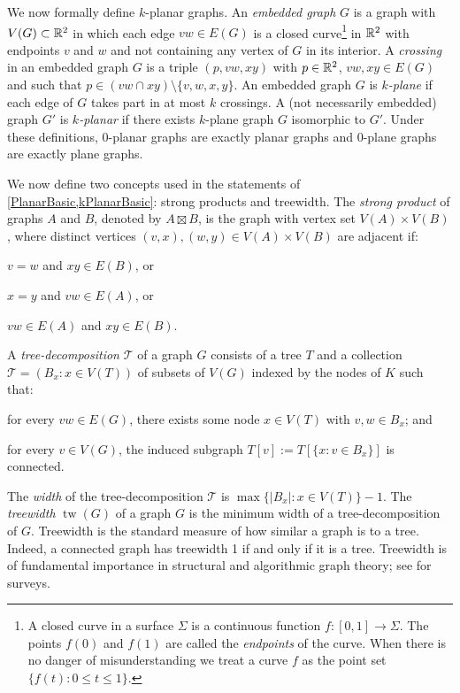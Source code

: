 \documentclass{patmorin}
\DeclareMathOperator{\tw}{tw}
\renewcommand{\le}{\leqslant}
\begin{document}
We now formally define $k$-planar graphs.  An \emph{embedded graph} $G$ is a graph with $V(G)\subset\mathbb{R}^2$ in which each edge $vw\in E(G)$ is a closed curve\footnote{A closed curve in a surface $\Sigma$ is a continuous function $f:[0,1]\to \Sigma$. The points $f(0)$ and $f(1)$ are called the \emph{endpoints} of the curve.  When there is no danger of misunderstanding we treat a curve $f$ as the point set $\{f(t):0\le t\le 1\}$.} in $\mathbb{R}^2$ with endpoints $v$ and $w$ and not containing any vertex of $G$ in its interior.  A \emph{crossing} in an embedded graph $G$ is a triple $(p,vw,xy)$ with $p\in\mathbb{R}^2$, $vw,xy\in E(G)$ and such that $p\in (vw\cap xy)\setminus\{v,w,x,y\}$. An embedded graph $G$ is \emph{$k$-plane} if each edge of $G$ takes part in at most $k$ crossings.  A (not necessarily embedded) graph $G'$ is \emph{$k$-planar} if there exists $k$-plane graph $G$ isomorphic to $G'$.  Under these definitions, $0$-planar graphs are exactly planar graphs and $0$-plane graphs are exactly plane graphs. 

We now define two concepts used in the statements of \cref{PlanarBasic,kPlanarBasic}: strong products and treewidth. The \emph{strong product} of graphs $A$ and $B$, denoted by $A\boxtimes B$, is the graph with vertex set $V(A)\times V(B)$, where distinct vertices $(v,x),(w,y)\in V(A)\times V(B)$ are adjacent if: 
\begin{compactitem}
\item  $v=w$ and $xy\in E(B)$, or 
\item  $x=y$ and $vw\in E(A)$, or  
\item  $vw\in E(A)$ and $xy\in E(B)$. 
\end{compactitem}
A \emph{tree-decomposition} $\mathcal{T}$ of a graph $G$ consists of a tree $T$ and a collection $\mathcal{T}=(B_x:x\in V(T))$ of subsets of $V(G)$ indexed by the nodes of $K$ such that:
\begin{compactenum}[(i)]
\item for every $vw\in E(G)$, there exists some node $x\in V(T)$ with $v,w\in B_x$; and 
\item for every $v\in V(G)$, the induced subgraph $T[v] := T[\{x: v\in B_x\}]$ is connected.  
\end{compactenum}
The \emph{width} of the tree-decomposition $\mathcal{T}$ is $\max\{|B_x|:x\in V(T)\}-1$.  The \emph{treewidth} $\tw(G)$ of a graph $G$ is the minimum width of a tree-decomposition of $G$.  Treewidth is the standard measure of how similar a graph is to a tree. Indeed, a connected graph has treewidth 1 if and only if it is a tree. Treewidth is of fundamental importance in structural and algorithmic graph theory; see \citep{Reed03,HW17,Bodlaender-TCS98} for surveys. 
\end{document}
